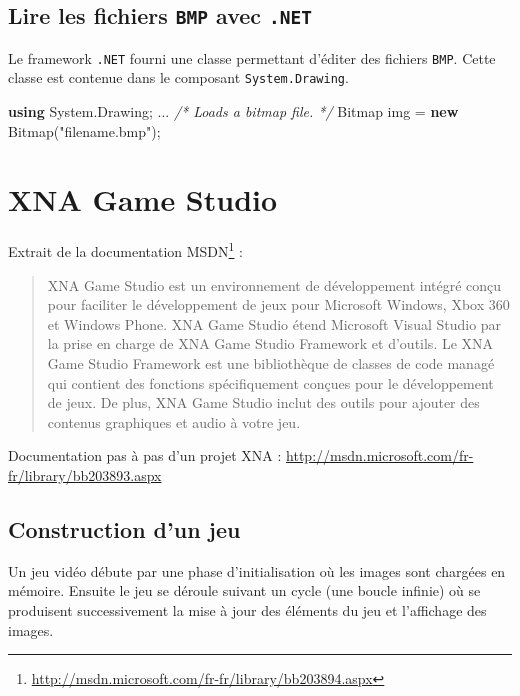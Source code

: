 \documentclass[11pt, a4paper]{article}
\newenvironment{Shaded}{}{}
\newcommand{\KeywordTok}[1]{\textcolor[rgb]{0.00,0.44,0.13}{\textbf{{#1}}}}
\newcommand{\StringTok}[1]{\textcolor[rgb]{0.25,0.44,0.63}{{#1}}}
\newcommand{\CommentTok}[1]{\textcolor[rgb]{0.38,0.63,0.69}{\textit{{#1}}}}
\newcommand{\FunctionTok}[1]{\textcolor[rgb]{0.02,0.16,0.49}{{#1}}}
\newcommand{\NormalTok}[1]{{#1}}
\begin{document}
\subsection{Lire les fichiers \texttt{BMP} avec
\texttt{.NET}}\label{lire-les-fichiers-bmp-avec-.net}

Le framework \texttt{.NET} fourni une classe permettant d'éditer des
fichiers \texttt{BMP}. Cette classe est contenue dans le composant
\texttt{System.Drawing}.

\begin{Shaded}
\begin{Highlighting}[]
\KeywordTok{using} \NormalTok{System.}\FunctionTok{Drawing}\NormalTok{;}
\NormalTok{...}
\CommentTok{/* Loads a bitmap file. */}
\NormalTok{Bitmap img = }\KeywordTok{new} \FunctionTok{Bitmap}\NormalTok{(}\StringTok{"filename.bmp"}\NormalTok{);}
\end{Highlighting}
\end{Shaded}
\section{XNA Game Studio}\label{xna-game-studio}

Extrait de la documentation
MSDN\footnote{\url{http://msdn.microsoft.com/fr-fr/library/bb203894.aspx}}
:

\begin{quote}
XNA Game Studio est un environnement de développement intégré conçu pour faciliter le développement de jeux pour Microsoft Windows, Xbox 360 et Windows Phone. XNA Game Studio étend Microsoft Visual Studio par la prise en charge de XNA Game Studio Framework et d'outils. Le XNA Game Studio Framework est une bibliothèque de classes de code managé qui contient des fonctions spécifiquement conçues pour le développement de jeux. De plus, XNA Game Studio inclut des outils pour ajouter des contenus graphiques et audio à votre jeu.
\end{quote}

Documentation pas à pas d'un projet XNA :
\url{http://msdn.microsoft.com/fr-fr/library/bb203893.aspx}

\subsection{Construction d'un jeu}\label{construction-dun-jeu}

Un jeu vidéo débute par une phase d'initialisation où les images sont
chargées en mémoire. Ensuite le jeu se déroule suivant un cycle (une
boucle infinie) où se produisent successivement la mise à jour des
éléments du jeu et l'affichage des images.
\end{document}
